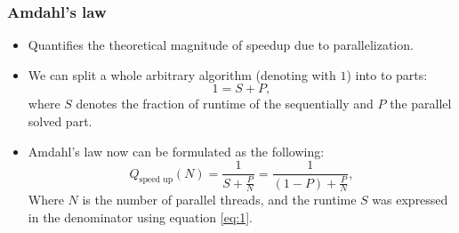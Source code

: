 \begin{frame}
\frametitle{Amdahl's law}

\begin{itemize}
	\item<1-> Quantifies the theoretical magnitude of speedup due to parallelization.
	\item<2-> We can split a whole arbitrary algorithm (denoting with $1$) into to parts:
	\begin{equation} \label{eq:1}
		1 = S + P,
	\end{equation}
	where $S$ denotes the fraction of runtime of the sequentially and $P$ the parallel solved part.
	\item<3-> Amdahl's law now can be formulated as the following:
	\begin{equation} \label{eq:2}
		Q_{\text{speed up}} \left( N \right)
		=
		\frac{1}{S + \frac{P}{N}}
		=
		\frac{1}{\left( 1 - P \right) + \frac{P}{N}},
	\end{equation}
	Where $N$ is the number of parallel threads, and the runtime $S$ was expressed in the denominator using equation \eqref{eq:1}.
\end{itemize}

\end{frame}